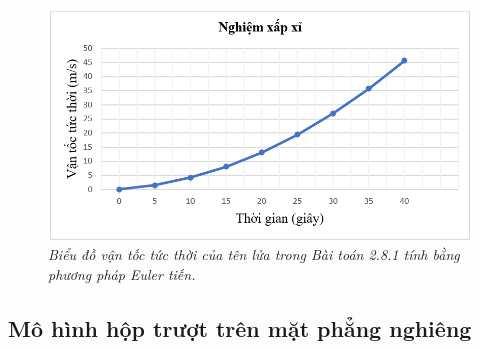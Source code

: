 \begin{figure}[H]
	\centering
	\includegraphics[scale=0.9]{Images/hinh_2_25.png}
	\caption[Biểu đồ vận tốc tức thời của tên lửa trong Bài toán 2.8.1 tính bằng phương pháp Euler tiến.
	]{\itshape\fontsize{13pt}{0pt}\selectfont\centering Biểu đồ vận tốc tức thời của tên lửa trong Bài toán 2.8.1 tính bằng phương pháp Euler tiến.}
	\label{hinh2.25}
\end{figure} 
\subsection{Mô hình hộp trượt trên mặt phẳng nghiêng}
